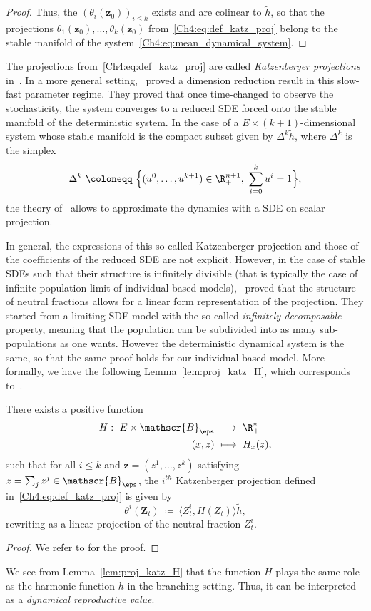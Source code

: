 \begin{refsegment}
\begin{proof}
 Thus, the $(\theta_i(\bm z_0))_{i\leq k}$ exists and are colinear to $\tilde h$, so that the projections $\theta_1(\bm z_0),\ldots, \theta_k(\bm z_0)$ from~\eqref{Ch4:eq:def_katz_proj} belong to the stable manifold of the system~\eqref{Ch4:eq:mean_dynamical_system}.
\end{proof}
 The projections from~\eqref{Ch4:eq:def_katz_proj} are called \emph{Katzenberger projections} in~\cite{Julie_Zsofia}.
In a more general setting,~\cite{Katzenberger:1991aa} proved a dimension reduction result in this slow-fast parameter regime. They proved that once time-changed to observe the stochasticity, the system converges to a reduced SDE forced onto the stable manifold of the deterministic system. In the case of a $E\times (k+1)$-dimensional system whose stable manifold is the compact subset given by $\Delta^k \tilde h$, where $\Delta^k$ is the simplex 
\[ \Delta^k\ \coloneqq\ \Big\{(u^0,\ldots, u^{k+1})\in \R_+^{n+1},\  \sum_{i=0}^k u^{i}=1\Big\},\] 
the theory of~\cite{Katzenberger:1991aa} allows to approximate the dynamics with a SDE on scalar projection. 

In general, the expressions of this so-called Katzenberger projection and those of the coefficients of the reduced SDE are not explicit.
However, in the case of stable SDEs such that their structure is infinitely divisible (that is typically the case of infinite-population limit of individual-based models),~\citet{Julie_Zsofia} proved that the structure of neutral fractions allows for a linear form representation of the projection. They started from a limiting SDE model with the so-called \emph{infinitely decomposable} property, meaning that the population can be subdivided into as many  sub-populations as one wants.
However the deterministic dynamical system is the same,  so that the same proof holds for our individual-based model. 
 More formally, we have the following Lemma~\ref{lem:proj_katz_H}, which corresponds to~\citet[Proposition~7]{Julie_Zsofia}.
 \begin{lem}\label{lem:proj_katz_H}
There exists a positive function
\[
\begin{aligned}
H:\  E\times \mathscr{B}_{\eps}\ &\longrightarrow\ \R^*_+\\
 (x, z)\ &\longmapsto\ H_x(z),
\end{aligned}
\]
such that for all $i\leq k$ and $\bm z=(z^1,\ldots, z^k)$ satisfying $z=\sum_j z^j\in \mathscr{B}_{\eps}$, the $i^{th}$ Katzenberger
projection defined in~\eqref{Ch4:eq:def_katz_proj} is given by
\[\theta^i(\bm Z_t)\ \coloneqq\ \langle  Z_t^{i}, H( Z_t)\rangle \tilde h,\] 
rewriting as a linear projection of the neutral fraction $ Z_t^{i}$. 
 \end{lem}
 \begin{proof}
 We refer to \citet[Proposition~7]{Julie_Zsofia} for the proof.
 \end{proof}
We see from Lemma~\ref{lem:proj_katz_H} that the function $H$ plays the same role as the harmonic function $h$ in the branching setting. Thus, it can be interpreted as a \textit{dynamical reproductive value}.


\end{refsegment}
